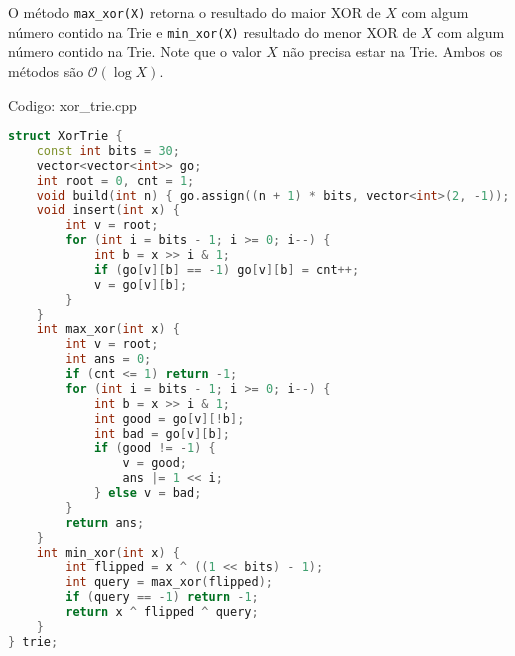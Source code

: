\documentclass[10pt, a4paper, oneside]{book}
\begin{document}
O método \texttt{max\_xor(X)} retorna o resultado do maior XOR de $X$ com algum número contido na Trie e \texttt{min\_xor(X)} resultado do menor XOR de $X$ com algum número contido na Trie. Note que o valor $X$ não precisa estar na Trie. Ambos os métodos são $\mathcal{O}(\log X)$.

\hfill

Codigo: xor\_trie.cpp

\begin{lstlisting}[language=C++]
struct XorTrie {
    const int bits = 30;
    vector<vector<int>> go;
    int root = 0, cnt = 1;
    void build(int n) { go.assign((n + 1) * bits, vector<int>(2, -1)); }
    void insert(int x) {
        int v = root;
        for (int i = bits - 1; i >= 0; i--) {
            int b = x >> i & 1;
            if (go[v][b] == -1) go[v][b] = cnt++;
            v = go[v][b];
        }
    }
    int max_xor(int x) {
        int v = root;
        int ans = 0;
        if (cnt <= 1) return -1;
        for (int i = bits - 1; i >= 0; i--) {
            int b = x >> i & 1;
            int good = go[v][!b];
            int bad = go[v][b];
            if (good != -1) {
                v = good;
                ans |= 1 << i;
            } else v = bad;
        }
        return ans;
    }
    int min_xor(int x) {
        int flipped = x ^ ((1 << bits) - 1);
        int query = max_xor(flipped);
        if (query == -1) return -1;
        return x ^ flipped ^ query;
    }
} trie;
\end{lstlisting}
\hfill
\end{document}
